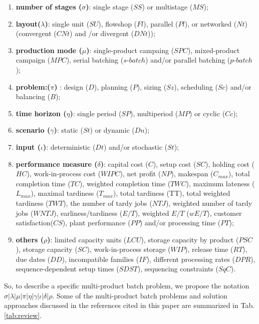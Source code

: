 \documentclass[10pt,fleqn,a4paper,twoside]{article}
\begin{document}
\begin{enumerate}[label=\arabic*)]
\item \textbf{number of stages ($\sigma$)}: single stage ($SS$) or multistage ($MS$);
\item \textbf{layout($\lambda$)}: single unit ($SU$), flowshop ($Fl$), parallel ($Pl$), or networked ($Nt$) (convergent ($CNt$) and /or divergent ($DNt$));
\item \textbf{production mode ($\mu$)}: single-product campaing ($SPC$), mixed-product campaign ($MPC$), serial batching ($s\textrm{-}batch$) and/or parallel batching ($p\textrm{-}batch$);
\item \textbf{problem:($\pi$)}  : design ($D$), planning ($P$), sizing ($Sz$), scheduling ($Sc$) and/or balancing ($B$); 
\item \textbf{time horizon ($\eta$)}: single period ($SP$), multiperiod ($MP$) or cyclic ($Cc$);
\item \textbf{scenario ($\gamma$)}: static ($St$) or dynamic ($Dn$);
\item \textbf{input ($\iota$)}: deterministic ($Dt$) and/or stochastic ($St$);
\item \textbf{performance measure ($\delta$)}: capital cost ($C$), setup cost ($SC$), holding cost ($HC$), work-in-process cost ($WIPC$), net profit ($NP$), makespan ($C_{max}$), total completion time ($TC$), weighted completion time ($TWC$), maximum lateness ($L_{max}$), maximal tardiness ($T_{max}$), total tardiness (TT), total weighted tardiness ($TWT$), the number of tardy jobs ($NTJ$), weighted number of tardy jobs ($WNTJ$), earliness/tardiness ($E/T$), weighted $E/T$ ($wE/T$), customer satisfaction($CS$), plant performance ($PP$) and/or processing time ($PT$);
\item \textbf{others ($\rho$)}: limited capacity units ($LCU$), storage capacity by product ($PSC$), storage capacity ($SC$), work-in-process storage ($WIP$), release time ($RT$), due dates ($DD$), incompatible families ($IF$), different processing rates ($DPR$), sequence-dependent setup times ($SDST$), sequencing constraints ($SqC$).
\end{enumerate}

So, to describe a speciﬁc multi-product batch problem, we propose the notation $\sigma|\lambda|\mu|\pi|\eta|\gamma|\iota|\delta|\rho$. Some of the multi-product batch problems and solution approaches discussed in the references cited in this paper are summarized in Tab. \ref{tab:review}.
\end{document}

